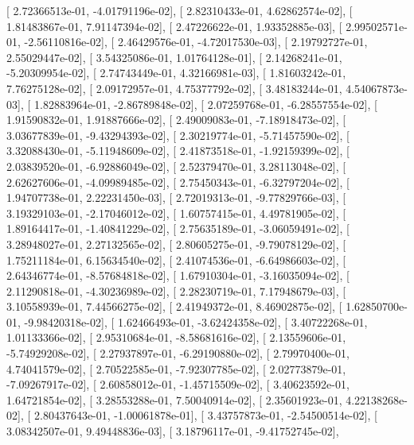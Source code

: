 \documentclass{article}
\begin{document}
       [  2.72366513e-01,  -4.01791196e-02],
       [  2.82310433e-01,   4.62862574e-02],
       [  1.81483867e-01,   7.91147394e-02],
       [  2.47226622e-01,   1.93352885e-03],
       [  2.99502571e-01,  -2.56110816e-02],
       [  2.46429576e-01,  -4.72017530e-03],
       [  2.19792727e-01,   2.55029447e-02],
       [  3.54325086e-01,   1.01764128e-01],
       [  2.14268241e-01,  -5.20309954e-02],
       [  2.74743449e-01,   4.32166981e-03],
       [  1.81603242e-01,   7.76275128e-02],
       [  2.09172957e-01,   4.75377792e-02],
       [  3.48183244e-01,   4.54067873e-03],
       [  1.82883964e-01,  -2.86789848e-02],
       [  2.07259768e-01,  -6.28557554e-02],
       [  1.91590832e-01,   1.91887666e-02],
       [  2.49009083e-01,  -7.18918473e-02],
       [  3.03677839e-01,  -9.43294393e-02],
       [  2.30219774e-01,  -5.71457590e-02],
       [  3.32088430e-01,  -5.11948609e-02],
       [  2.41873518e-01,  -1.92159399e-02],
       [  2.03839520e-01,  -6.92886049e-02],
       [  2.52379470e-01,   3.28113048e-02],
       [  2.62627606e-01,  -4.09989485e-02],
       [  2.75450343e-01,  -6.32797204e-02],
       [  1.94707738e-01,   2.22231450e-03],
       [  2.72019313e-01,  -9.77829766e-03],
       [  3.19329103e-01,  -2.17046012e-02],
       [  1.60757415e-01,   4.49781905e-02],
       [  1.89164417e-01,  -1.40841229e-02],
       [  2.75635189e-01,  -3.06059491e-02],
       [  3.28948027e-01,   2.27132565e-02],
       [  2.80605275e-01,  -9.79078129e-02],
       [  1.75211184e-01,   6.15634540e-02],
       [  2.41074536e-01,  -6.64986603e-02],
       [  2.64346774e-01,  -8.57684818e-02],
       [  1.67910304e-01,  -3.16035094e-02],
       [  2.11290818e-01,  -4.30236989e-02],
       [  2.28230719e-01,   7.17948679e-03],
       [  3.10558939e-01,   7.44566275e-02],
       [  2.41949372e-01,   8.46902875e-02],
       [  1.62850700e-01,  -9.98420318e-02],
       [  1.62466493e-01,  -3.62424358e-02],
       [  3.40722268e-01,   1.01133366e-02],
       [  2.95310684e-01,  -8.58681616e-02],
       [  2.13559606e-01,  -5.74929208e-02],
       [  2.27937897e-01,  -6.29190880e-02],
       [  2.79970400e-01,   4.74041579e-02],
       [  2.70522585e-01,  -7.92307785e-02],
       [  2.02773879e-01,  -7.09267917e-02],
       [  2.60858012e-01,  -1.45715509e-02],
       [  3.40623592e-01,   1.64721854e-02],
       [  3.28553288e-01,   7.50040914e-02],
       [  2.35601923e-01,   4.22138268e-02],
       [  2.80437643e-01,  -1.00061878e-01],
       [  3.43757873e-01,  -2.54500514e-02],
       [  3.08342507e-01,   9.49448836e-03],
       [  3.18796117e-01,  -9.41752745e-02],
\end{document}
